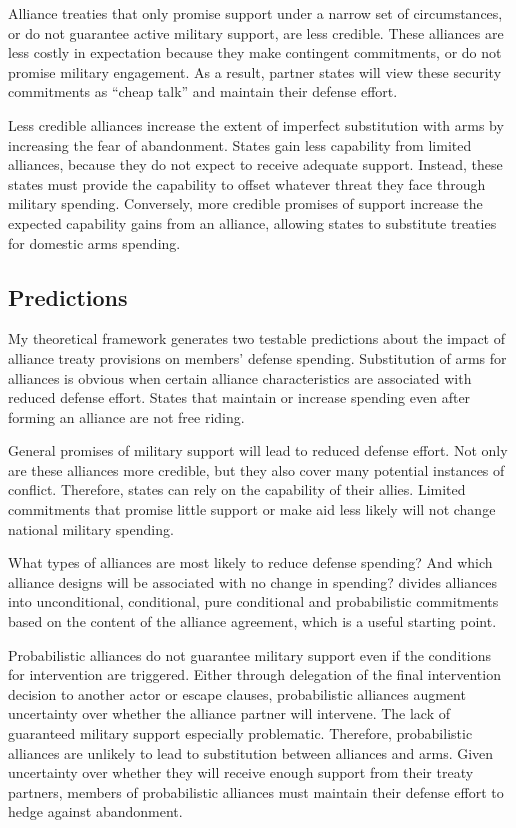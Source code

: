 \documentclass[12pt]{article}
\begin{document}
Alliance treaties that only promise support under a narrow set of circumstances, or do not guarantee active military support, are less credible. These alliances are less costly in expectation because they make contingent commitments, or do not promise military engagement. As a result, partner states will view these security commitments as ``cheap talk'' and maintain their defense effort. 

Less credible alliances increase the extent of imperfect substitution with arms by increasing the fear of abandonment. States gain less capability from limited alliances, because they do not expect to receive adequate support. Instead, these states must provide the capability to offset whatever threat they face through military spending. Conversely, more credible promises of support increase the expected capability gains from an alliance, allowing states to substitute treaties for domestic arms spending. 


\subsection*{Predictions}

My theoretical framework generates two testable predictions about the impact of alliance treaty provisions on members' defense spending. Substitution of arms for alliances is obvious when certain alliance characteristics are associated with reduced defense effort. States that maintain or increase spending even after forming an alliance are not free riding. 

General promises of military support will lead to reduced defense effort. Not only are these alliances more credible, but they also cover many potential instances of conflict. Therefore, states can rely on the capability of their allies. Limited commitments that promise little support or make aid less likely will not change national military spending. 

What types of alliances are most likely to reduce defense spending? And which alliance designs will be associated with no change in spending? \citet{Benson2011, Benson2012} divides alliances into unconditional, conditional, pure conditional and probabilistic commitments based on the content of the alliance agreement, which is a useful starting point. 

Probabilistic alliances do not guarantee military support even if the conditions for intervention are triggered. Either through delegation of the final intervention decision to another actor or escape clauses, probabilistic alliances augment uncertainty over whether the alliance partner will intervene. The lack of guaranteed military support especially problematic. Therefore, probabilistic alliances are unlikely to lead to substitution between alliances and arms. Given uncertainty over whether they will receive enough support from their treaty partners, members of probabilistic alliances must maintain their defense effort to hedge against abandonment. 
\end{document}
